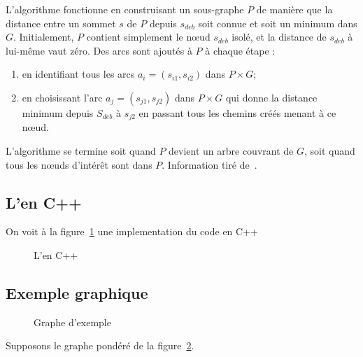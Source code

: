 L'algorithme fonctionne en construisant un sous-graphe $P$ de manière que la distance entre un sommet $s$  de $P$ depuis $s_{deb}$ soit connue et soit un minimum dans $G$. Initialement, $P$ contient simplement le nœud $s_{deb}$ isolé, et la distance de $s_{deb}$ à lui-même vaut zéro. Des arcs sont ajoutés à $P$ à chaque étape :
\begin{enumerate}
\item en identifiant tous les arcs $a_{i}=(s_{i1},s_{i2})$ dans $P\times G$;
\item en choisissant l'arc $a_{j}=(s_{j1},s_{j2})$ dans $P\times G$ qui donne la distance minimum depuis $S_{deb}$  à $s_{j2}$ en passant tous les chemins créés menant à ce nœud.
\end{enumerate}
L'algorithme se termine soit quand $P$ devient un arbre couvrant de $G$, soit quand tous les nœuds d'intérêt sont dans $P$.
Information tiré de~\cite{dijkstra.algo.wiki}.
\subsection{L'\algo en C++}
On voit à la figure~\ref{algo_code} une implementation du code en C++
\begin{figure}[!htb]

\caption{L'\algo en C++}\label{algo_code}
\end{figure}

\subsection{Exemple graphique}
\begin{figure}[!htb]
\centering
{}
\caption{Graphe d'exemple}
\label{graphbase}
\end{figure}
Supposons le graphe pondéré de la figure~\ref{graphbase}.

